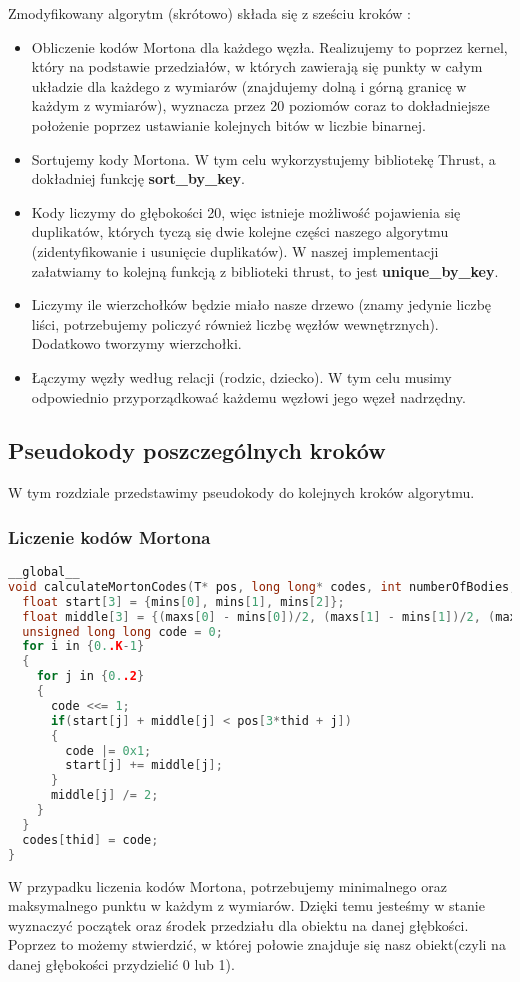 \documentclass[14pt,twoside,a4paper]{article}
\theoremstyle{definition}
\begin{document}
Zmodyfikowany algorytm (skrótowo) składa się z sześciu kroków :
\begin{itemize}
\item Obliczenie kodów Mortona dla każdego węzła. Realizujemy to poprzez kernel, który na podstawie przedziałów, w których zawierają się punkty w całym układzie dla każdego z wymiarów (znajdujemy dolną i górną granicę w każdym z wymiarów), wyznacza przez 20 poziomów coraz to dokładniejsze położenie poprzez ustawianie kolejnych bitów w liczbie binarnej. 
\item Sortujemy kody Mortona. W tym celu wykorzystujemy bibliotekę Thrust, a dokładniej funkcję \textbf{sort\_by\_key}. 
\item Kody liczymy do głębokości 20, więc istnieje możliwość pojawienia się duplikatów, których tyczą się dwie kolejne części naszego algorytmu (zidentyfikowanie i usunięcie duplikatów). W naszej implementacji załatwiamy to kolejną funkcją z biblioteki thrust, to jest \textbf{unique\_by\_key}.
\item Liczymy ile wierzchołków będzie miało nasze drzewo (znamy jedynie liczbę liści, potrzebujemy policzyć również liczbę węzłów wewnętrznych). Dodatkowo tworzymy wierzchołki.
\item  Łączymy węzły według relacji (rodzic, dziecko). W tym celu musimy odpowiednio przyporządkować każdemu węzłowi jego węzeł nadrzędny.
\end{itemize}

\subsection{\Large Pseudokody poszczególnych kroków}
W tym rozdziale przedstawimy pseudokody do kolejnych kroków algorytmu.
\subsubsection{\large Liczenie kodów Mortona}
\begin{lstlisting}[language=C++, frame=single, framerule=2pt, caption=Krok 1]
__global__
void calculateMortonCodes(T* pos, long long* codes, int numberOfBodies, T* mins, T* maxs) {
  float start[3] = {mins[0], mins[1], mins[2]};
  float middle[3] = {(maxs[0] - mins[0])/2, (maxs[1] - mins[1])/2, (maxs[2] - mins[2])/2};
  unsigned long long code = 0;
  for i in {0..K-1} 
  {
    for j in {0..2}
    {
      code <<= 1;
      if(start[j] + middle[j] < pos[3*thid + j]) 
      {
        code |= 0x1;
        start[j] += middle[j];
      }
      middle[j] /= 2;
    }
  }
  codes[thid] = code;
}
\end{lstlisting}
W przypadku liczenia kodów Mortona, potrzebujemy minimalnego oraz maksymalnego punktu w każdym z wymiarów. Dzięki temu jesteśmy w stanie wyznaczyć początek oraz środek przedziału dla obiektu na danej głębkości. Poprzez to możemy stwierdzić, w której połowie znajduje się nasz obiekt(czyli na danej głębokości przydzielić 0 lub 1).
\end{document}
